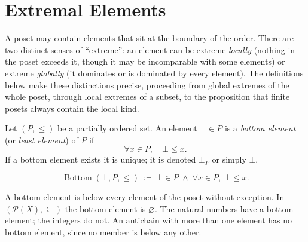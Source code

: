 
\section{Extremal Elements}
\label{sec:extremal-elements}

\begin{tcolorbox}[
  colback=gray!6,
  colframe=gray!40,
  arc=2pt,
  left=8pt, right=8pt, top=6pt, bottom=6pt,
  title={\small\textbf{Toolkit: Extremal Elements}},
  fonttitle=\small\bfseries
]
A poset may contain elements that sit at the boundary of the order.  There
are two distinct senses of ``extreme'': an element can be extreme
\emph{locally} (nothing in the poset exceeds it, though it may be
incomparable with some elements) or extreme \emph{globally} (it dominates
or is dominated by every element).  The definitions below make these
distinctions precise, proceeding from global extremes of the whole poset,
through local extremes of a subset, to the proposition that finite posets
always contain the local kind.
\end{tcolorbox}


\begin{tcolorbox}[colback=defbox, colframe=defborder, arc=2pt,
  left=6pt, right=6pt, top=4pt, bottom=4pt,
  title={\small\textbf{Definition (Bottom Element)}},
  fonttitle=\small\bfseries]
\begin{definition}
\label{def:bottom-element}
Let $(P, \leq)$ be a partially ordered set.  An element $\bot \in P$ is
a \emph{bottom element} (or \emph{least element}) of $P$ if
\[
\forall x \in P, \quad \bot \leq x.
\]
If a bottom element exists it is unique; it is denoted $\bot_P$ or
simply $\bot$.
\end{definition}
\end{tcolorbox}

\begin{remark*}
\[
\operatorname{Bottom}(\bot, P, \leq)
\;\coloneqq\;
\bot \in P \;\land\; \forall x \in P,\; \bot \leq x.
\]
\end{remark*}

\begin{remark*}[Interpretation]
A bottom element is below every element of the poset without exception.
In $(\mathcal{P}(X), \subseteq)$ the bottom element is $\varnothing$.
The natural numbers have a bottom element; the integers do not.
An antichain with more than one element has no bottom element, since no
member is below any other.
\end{remark*}

